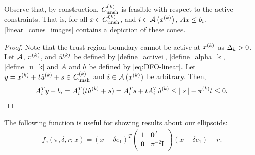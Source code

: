 Observe that, by construction, ${C^{(k)}_{\textrm{unsh}}}$ is feasible with respect to the active constraints.
That is,  for all $x \in {C^{(k)}_{\textrm{unsh}}}$,  and $i \in {\mathcal A}\left(x^{(k)}\right)$, ${A} x \le {b}_i$.
\cref{linear_cones_images} contains a depiction of these cones.




\begin{proof}
Note that the trust region boundary cannot be active at $x^{(k)}$ as $\Delta_k > 0$.
Let ${\mathcal A}$, $\pi^{(k)}$, and ${{{\hat u}^{(k)}}}$ be defined by \cref{define_activei}, \cref{define_alpha_k}, \cref{define_u_k} and
${A}$ and ${b}$ be defined by \cref{eq:DFO-linear}.
Let $y = x^{(k)} + t{{{\hat u}^{(k)}}} + s \in {C^{(k)}_{\textrm{unsh}}}$ and $i \in {\mathcal A}\left(x^{(k)}\right)$ be arbitrary.
Then,
\begin{align*}
{{A}}_{i}^Ty - {{b}}_{i} = {{A}}_{i}^T(t{{{\hat u}^{(k)}}} + s) = {{A}}_{i}^Ts + t {{A}}_{i}^T{{{\hat u}^{(k)}}} \le \|s\| - \pi^{(k)} t \le 0.
\end{align*}
\end{proof}

The following function is useful for showing results about our ellipsoids:
\begin{align}
f_{e}(\pi, \delta, r; x) = (x - \delta e_1)^T
\begin{pmatrix}
1 & \boldsymbol0^T \\
\boldsymbol 0 & \pi^{-2} \boldsymbol I \\
\end{pmatrix}
(x - \delta e_1) - r. \label{define_ellipsoid_function}
\end{align}


